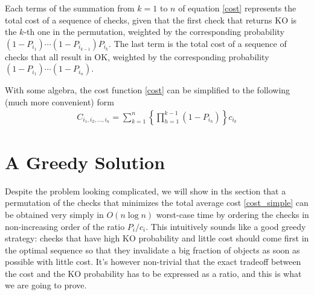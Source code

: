 \documentclass[10pt,a4paper]{article}
\begin{document}
Each terms of the summation from $k=1$ to $n$ of equation \eqref{cost} represents the total cost of a sequence of checks, given that the first check that returns KO is the $k$-th one in the permutation, weighted by the corresponding probability $(1-P_{i_{1}}) \cdots (1-P_{i_{k-1}})P_{i_{k}}$. The last term is the total cost of a sequence of checks that all result in OK, weighted by the corresponding probability $(1-P_{i_{1}}) \cdots (1-P_{i_{n}})$.

With some algebra, the cost function \eqref{cost} can be simplified to the following (much more convenient) form
\begin{equation}\label{cost_simple}
\begin{split}
	C_{i_{1},i_{2},\ldots,i_{n}} = \sum_{k=1}^{n} \left\{\prod_{h=1}^{k-1}(1-P_{i_{h}}) \right\}c_{i_{k}}
\end{split}
\end{equation}


\section{A Greedy Solution}

Despite the problem looking complicated, we will show in ths section that a permutation of the checks that minimizes the total average cost \eqref{cost_simple} can be obtained very simply in $O(n \log n)$ worst-case time by ordering the checks in non-increasing order of the ratio $P_{i}/c_{i}$. This intuitively sounds like a good greedy strategy: checks that have high KO probability and little cost should come first in the optimal sequence so that they invalidate a big fraction of objects as soon as possible with little cost. It's however non-trivial that the exact tradeoff between the cost and the KO probability has to be expressed as a ratio, and this is what we are going to prove.
\end{document}
